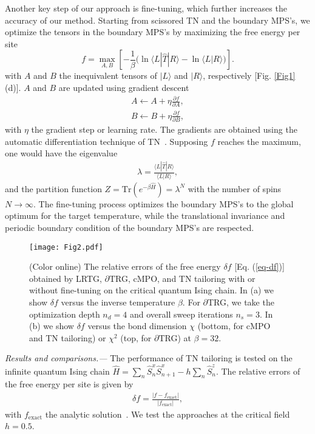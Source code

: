 \documentclass[aps,prl,twocolumn,superscriptaddress,a4paper,english,longbibliography]{revtex4-1}
\begin{document}
Another key step of our approach is fine-tuning, which further increases the accuracy of our method. Starting from scissored TN and the boundary MPS's, we optimize the tensors in the boundary MPS's by maximizing the free energy per site 
\begin{equation}\label{app-eq-f}
	f  = \max_{A, B} \left[ -\frac{1}{\beta} \Big (\ln \langle L|\hat{T}|R\rangle - \ln \langle L|R\rangle\Big) \right].
\end{equation} 
with $A$ and $B$ the inequivalent tensors of $|L\rangle$ and $|R\rangle$, respectively [Fig. \ref{Fig1} (d)]. $A$ and $B$ are updated using gradient descent
\begin{eqnarray}\label{app-eq-grad}
	A \leftarrow A + \eta \frac{\partial f}{\partial A}, \\
	B \leftarrow B + \eta \frac{\partial f}{\partial B},
\end{eqnarray}
with $\eta$ the gradient step or learning rate. The gradients are obtained using the automatic differentiation technique of TN~\cite{PhysRevX.9.031041,pytorch}. Supposing $f$ reaches the maximum, one would have the eigenvalue
\begin{eqnarray}\label{app-Z}
	\lambda = \frac{\langle L| \hat{T} |R\rangle}{\langle L | R \rangle},
\end{eqnarray} 
and the partition function $Z = \text{Tr}(e^{-\beta \hat{H}}) = \lambda^N$ with the number of spins $N \to \infty$. The fine-tuning process optimizes the boundary MPS's to the global optimum for the target temperature, while the translational invariance and periodic boundary condition of the boundary MPS's are respected.

\begin{figure}[tbp]
	\centering
	\texttt{[image: Fig2.pdf]}
	\caption{(Color online) The relative errors of the free energy $\delta f$ [Eq. (\ref{eq-df})] obtained by LRTG, $\partial$TRG, cMPO, and TN tailoring with or without fine-tuning on the critical quantum Ising chain. In (a) we show $\delta f$ versus the inverse temperature $\beta$. For $\partial$TRG, we take the optimization depth $n_{d}=4$ and overall sweep iterations $n_{s}=3$. In (b) we show $\delta f$ versus the bond dimension $\chi$ (bottom, for cMPO and TN tailoring) or $\chi^{2}$ (top, for $\partial$TRG) at $\beta=32$.}
	\label{Fig2}
\end{figure}

{\it Results and comparisons.---}
The performance of TN tailoring is tested on the infinite quantum Ising chain
$\hat{H} = \sum_{n} \hat{S}_n^x \hat{S}_{n+1}^x - h \sum_{n} \hat{S}^z_n$. The relative errors of the free energy per site is given by
\begin{eqnarray} \label{eq-df}
	\delta f =\frac{|f-f_{\text{exact}}|}{|f_{\text{exact}}|} ,
\end{eqnarray}
with $f_{\text{exact}}$ the analytic solution~\cite{1985issm.book....5B}. We test the approaches at the critical field $h=0.5$. 
\end{document}
